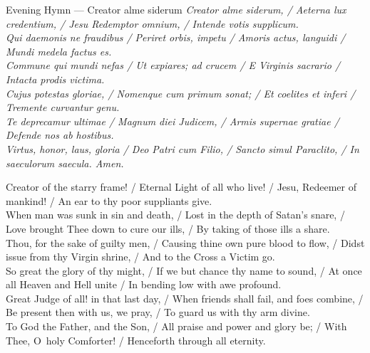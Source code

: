 \begin{massbox}{Evening Hymn --- Creator alme siderum}
\textit{Creator alme siderum, / Aeterna lux credentium, / Jesu Redemptor omnium, / Intende votis supplicum.}\\
\textit{Qui daemonis ne fraudibus / Periret orbis, impetu / Amoris actus, languidi / Mundi medela factus es.}\\
\textit{Commune qui mundi nefas / Ut expiares; ad crucem / E Virginis sacrario / Intacta prodis victima.}\\
\textit{Cujus potestas gloriae, / Nomenque cum primum sonat; / Et coelites et inferi / Tremente curvantur genu.}\\
\textit{Te deprecamur ultimae / Magnum diei Judicem, / Armis supernae gratiae / Defende nos ab hostibus.}\\
\textit{Virtus, honor, laus, gloria / Deo Patri cum Filio, / Sancto simul Paraclito, / In saeculorum saecula. Amen.}

\medskip
Creator of the starry frame! / Eternal Light of all who live! / Jesu, Redeemer of mankind! / An ear to thy poor suppliants give.\\
When man was sunk in sin and death, / Lost in the depth of Satan's snare, / Love brought Thee down to cure our ills, / By taking of those ills a share.\\
Thou, for the sake of guilty men, / Causing thine own pure blood to flow, / Didst issue from thy Virgin shrine, / And to the Cross a Victim go.\\
So great the glory of thy might, / If we but chance thy name to sound, / At once all Heaven and Hell unite / In bending low with awe profound.\\
Great Judge of all! in that last day, / When friends shall fail, and foes combine, / Be present then with us, we pray, / To guard us with thy arm divine.\\
To God the Father, and the Son, / All praise and power and glory be; / With Thee, O~holy Comforter! / Henceforth through all eternity.
\end{massbox}

